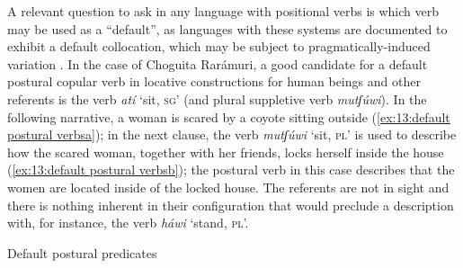 A relevant question to ask in any language with positional verbs is which verb may be used as a ``default'', as languages with these systems are documented to exhibit a default collocation, which may be subject to pragmatically-induced variation \parencite{ameka2007introduction}. In the case of Choguita Rarámuri, a good candidate for a default postural copular verb in locative constructions for human beings and other referents  is the verb \textit{atí} ‘sit, \textsc{sg}’ (and plural suppletive verb \textit{mutʃúwi}). In the following narrative, a woman is scared by a coyote sitting outside (\ref{ex:13:default postural verbsa}); in the next clause, the verb \textit{mutʃúwi} ‘sit, \textsc{pl}’ is used to describe how the scared woman, together with her friends, locks herself inside the house (\ref{ex:13:default postural verbsb}); the postural verb in this case describes that the women are located inside of the locked house. The referents are not in sight and there is nothing inherent in their configuration that would preclude a description with, for instance, the verb \textit{háwi} ‘stand, \textsc{pl}’.

\ea\label{ex:13:default postural verbs}
{Default postural predicates}

    \label{ex:13:default postural verbsa}
        \label{ex:13:default postural verbsb}
    \z
\z


